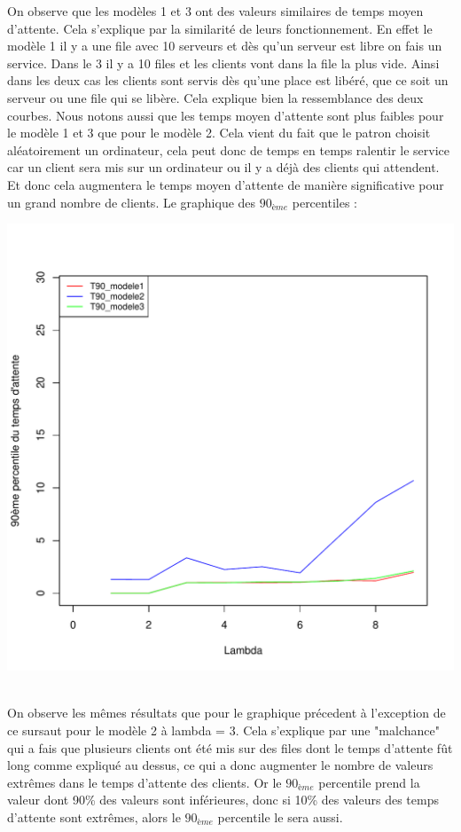 \documentclass[a4paper,11pt]{article}
\begin{document}
	On observe que les modèles 1 et 3 ont des valeurs similaires de temps moyen d'attente. Cela s'explique par la similarité de leurs fonctionnement. En effet le modèle 1
	il y a une file avec 10 serveurs et dès qu'un serveur est libre on fais un service. Dans le 3 il y a 10 files et les clients vont dans la file la plus vide. Ainsi 
	dans les deux cas les clients sont servis dès qu'une place est libéré, que ce soit un serveur ou une file qui se libère. Cela explique bien la ressemblance des deux courbes. 
	Nous notons aussi que les temps moyen d'attente sont plus faibles pour le modèle 1 et 3 que pour le modèle 2. Cela vient du fait que le patron choisit aléatoirement un ordinateur, cela peut donc 
	de temps en temps ralentir le service car un client sera mis sur un ordinateur ou il y a déjà des clients qui attendent. Et donc cela augmentera le temps moyen d'attente de manière
	significative pour un grand nombre de clients.
	\newpage
	Le graphique des $90_{ème}$ percentiles : \\
	\label{fig2}
	\centerline{\includegraphics[scale=0.8]{t90.pdf}}\\
	
	On observe les mêmes résultats que pour le graphique précedent à l'exception de ce sursaut pour le modèle 2 à lambda = 3. 
	Cela s'explique par une "malchance" qui a fais que plusieurs clients ont été 
	mis sur des files dont le temps d'attente fût long comme expliqué au dessus, ce qui a donc augmenter le nombre de valeurs extrêmes dans le temps d'attente des clients. Or le $90_{ème}$ percentile
	prend la valeur dont 90\% des valeurs sont inférieures, donc si 10\% des valeurs des temps d'attente sont extrêmes, alors le $90_{ème}$ percentile le sera aussi.
\end{document}
